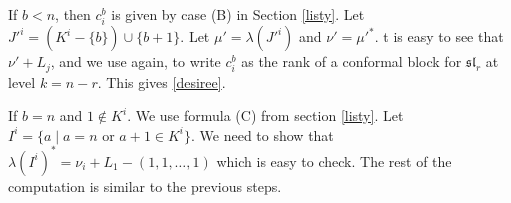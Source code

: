 If $b<n$, then $c^b_i$ is given by case (B) in Section \ref{listy}. Let $J'^i=(K^i-\{b\})\cup \{b+1\}$. Let $\mu'=\lambda(J'^i)$ and $\nu'=\mu'^*$. t is easy to see that $\nu'+L_j$, and we use  \cite[Proposition 3.4]{BHorn} again, to write $c^b_i$ as the rank of a conformal block for $\mathfrak{sl}_r$  at level $k=n-r$. This gives \eqref{desiree}.

If $b=n$ and $1\not\in K^i.$ We use formula (C) from section \ref{listy}. Let $I^i= \{a\mid a=n\text{ or } a+1\in K^i\}$. We need to show that $\lambda(I^i)^*=\nu_i +L_1 -(1,1,\dots,1)$ which is easy to check. The rest of the computation is similar to the previous steps.
